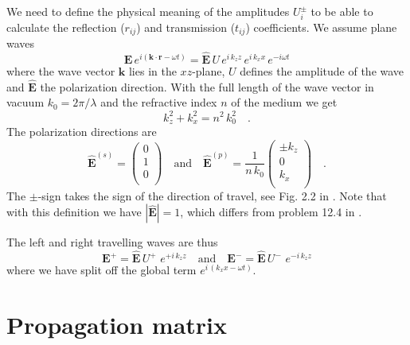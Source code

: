 We need to define the physical meaning of the amplitudes $U_i^\pm$ to be able to calculate the reflection ($r_{ij}$) and transmission ($t_{ij}$) coefficients. We assume plane waves 
\begin{equation}
\mathbf{E} \, e^{i (\mathbf{k}  \cdot \mathbf{r} - \omega t)}
=
\mathbf{\hat{E}} \, U \, e^{i \, k_z z} \, e^{i \, k_x x} \, e^{-i \omega t}
\end{equation}
where the wave vector $\mathbf{k} $ lies in the $xz$-plane, $U$ defines the amplitude of the wave and $\mathbf{\hat{E}} $  the polarization direction.
With   the full length of the wave vector in vacuum $k_0 = 2 \pi / \lambda$ and the refractive index $n$ of the medium we get
\begin{equation}
k_{z}^2 + k_{x}^2  = n^2 \, k_0^2  \quad . 
\end{equation}
The polarization directions are
\begin{equation}
\mathbf{\hat{E}}^{(s)} = \begin{pmatrix}
 0 \\ 1 \\ 0 \\
\end{pmatrix}
\quad 
\text{and}
\quad
\mathbf{\hat{E}}^{(p)} =\frac{1}{n \, k_0} \begin{pmatrix}
\pm k_z \\ 0 \\  k_x  \\
\end{pmatrix} \quad . \label{eq:surface_Esp_def}
\end{equation}
The $\pm$-sign takes the sign of the direction of travel, see Fig. 2.2 in \cite{Novotny-Hecht2012}. Note that with this definition we have $|\mathbf{\hat{E}}| = 1$, which differs from problem 12.4 in \cite{Novotny-Hecht2012}.

The left and right travelling waves are thus
\begin{equation}
\mathbf{E}^+ = \mathbf{\hat{E}} \, U^+ \, \, e^{+ i \, k_z z}
\quad
\text{and}
\quad
\mathbf{E}^- = \mathbf{\hat{E}} \, U^- \, \, e^{- i \, k_z z}
\end{equation}
where we have split off the global term $ e^{i \, ( k_x x - \omega t)}$.

\section{Propagation matrix}


